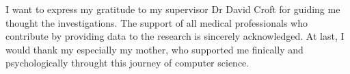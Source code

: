 I want to express my gratitude to my supervisor Dr David Croft for guiding me thought the investigations. 
The support of all medical professionals who contribute by providing data to the research is sincerely acknowledged. 
At last, I would thank my especially my mother, who supported me finically and psychologically throught this journey of computer science.